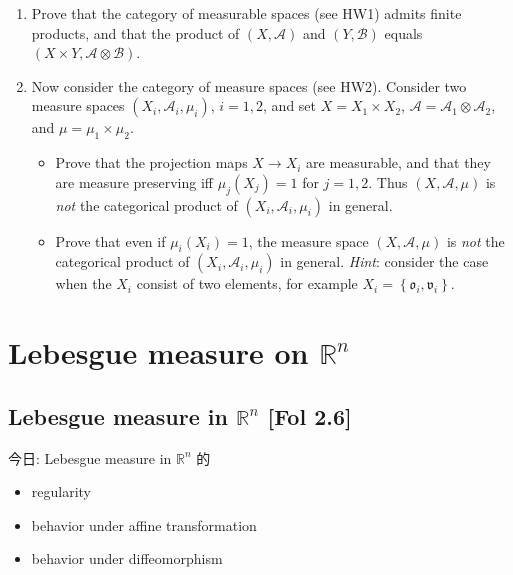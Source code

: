 \documentclass{qlnotes-export}
\begin{document}
\begin{enumerate}
\item
  Prove that the category of measurable spaces (see HW1) admits finite products, and that the product of \((X,\mathcal{A})\) and \((Y,\mathcal{B})\) equals \((X \times Y,\mathcal{A} \otimes \mathcal{B})\).
\item
  Now consider the category of measure spaces (see HW2). Consider two measure spaces \((X_{i},\mathcal{A}_{i},\mu_{i})\), \(i = 1,2\), and set \(X = X_{1} \times X_{2}\), \(\mathcal{A} = \mathcal{A}_{1} \otimes \mathcal{A}_{2}\), and \(\mu = \mu_{1} \times \mu_{2}\).

  \begin{itemize}
  \item
    Prove that the projection maps \(X\rightarrow X_{i}\) are measurable, and that they are measure preserving iff \(\mu_{j}(X_{j}) = 1\) for \(j = 1,2\). Thus \((X,\mathcal{A},\mu)\) is \emph{not} the categorical product of \((X_{i},\mathcal{A}_{i},\mu_{i})\) in general.
  \item
    Prove that even if \(\mu_{i}(X_{i}) = 1\), the measure space \((X,\mathcal{A},\mu)\) is \emph{not} the categorical product of \((X_{i},\mathcal{A}_{i},\mu_{i})\) in general. \emph{Hint}: consider the case when the \(X_{i}\) consist of two elements, for example \(X_{i} = \left\{ {{\mathfrak{o}}_{i},{\mathfrak{v}}_{i}} \right\}\).
  \end{itemize}
\end{enumerate}

\chapter{\texorpdfstring{Lebesgue measure on \({\mathbb{R}}^{n}\)}{Lebesgue measure on \{\textbackslash mathbb\{R\}\}\^{}\{n\}}}\label{lebesgue-measure-on-mathbbrn}

\section{\texorpdfstring{Lebesgue measure in \({\mathbb{R}}^{n}\) {[}Fol 2.6{]}}{Lebesgue measure in \{\textbackslash mathbb\{R\}\}\^{}\{n\} {[}Fol 2.6{]}}}

今日: Lebesgue measure in \({\mathbb{R}}^{n}\) 的

\begin{itemize}
\item
  regularity
\item
  behavior under affine transformation
\item
  behavior under diffeomorphism
\end{itemize}
\end{document}
